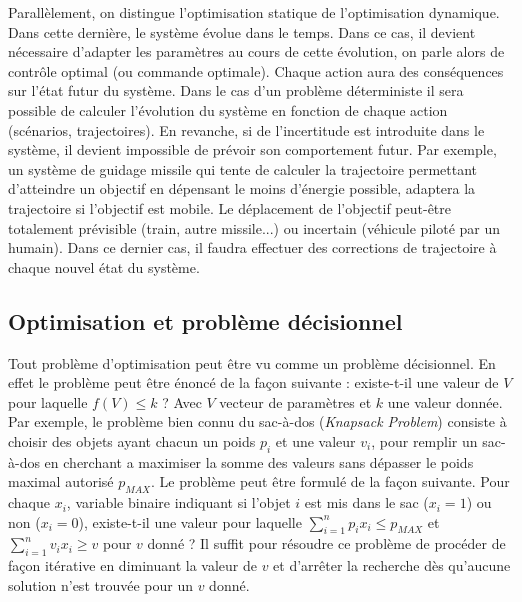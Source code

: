 Parallèlement, on distingue l'optimisation statique de l'optimisation dynamique. Dans cette dernière, le système évolue dans le temps. Dans ce cas, il devient nécessaire d'adapter les paramètres au cours de cette évolution, on parle alors de contrôle optimal (ou commande optimale). Chaque action aura des conséquences sur l'état futur du système. Dans le cas d'un problème déterministe il sera possible de calculer l'évolution du système en fonction de chaque action (scénarios, trajectoires). En revanche, si de l'incertitude est introduite dans le système, il devient impossible de prévoir son comportement futur. Par exemple, un système de guidage missile qui tente de calculer la trajectoire permettant d'atteindre un objectif en dépensant le moins d'énergie possible, adaptera la trajectoire si l'objectif est mobile. Le déplacement de l'objectif peut-être totalement prévisible (train, autre missile...) ou incertain (véhicule piloté par un humain). Dans ce dernier cas, il faudra effectuer des corrections de 
trajectoire à chaque nouvel état du système.


\subsection{Optimisation et problème décisionnel}
Tout problème d'optimisation peut être vu comme un problème décisionnel. En effet le problème peut être énoncé de la façon suivante : existe-t-il une valeur de $V$ pour laquelle $f(V) \leq k$ ? Avec $V$ vecteur de paramètres et $k$ une valeur donnée. Par exemple, le problème bien connu du sac-à-dos (\textit{Knapsack Problem}) consiste à choisir des objets ayant chacun un poids $p_i$ et une valeur $v_i$, pour remplir un sac-à-dos en cherchant a maximiser la somme des valeurs sans dépasser le poids maximal autorisé $p_{MAX}$. Le problème peut être formulé de la façon suivante. Pour chaque $x_i$, variable binaire indiquant si l'objet $i$ est mis dans le sac ($x_i=1$) ou non ($x_i=0$), existe-t-il une valeur pour laquelle $\sum \limits_{i=1}^{n} p_ix_i \leq p_{MAX}$ et $\sum \limits_{i=1}^{n} v_ix_i \geq v$ pour $v$ donné ? Il suffit pour résoudre ce problème de procéder de façon itérative en diminuant la valeur de $v$ et d'arrêter la recherche dès qu'aucune solution n'est trouvée pour un $v$ donné.

